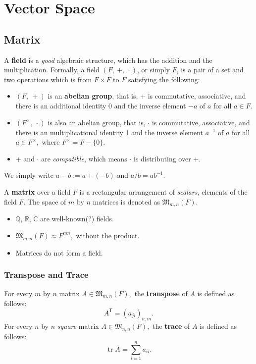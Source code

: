 \chapter{Vector Space}

\section{Matrix}
\begin{remind}
A \textbf{field} is a \textit{good} algebraic structure, which has the addition and the multiplication. Formally, a field $(F,~+,~\cdot)$, or simply $F$, is a pair of a set and two operations which is from $F\times F$ to $F$ satisfying the following:
\begin{itemize}
\item $(F,~ +)$ is an \textbf{abelian group}, that is, $+$ is commutative, associative, and there is an additional identity 0 and the inverse element $-a$ of $a$ for all $a \in F.$
\item $(F^{\times },~\cdot)$ is also an abelian group, that is, $\cdot$ is commutative, associative, and there is an multiplicational identity 1 and the inverse element $a^{-1}$ of $a$ for all $a \in F^{\times},$ where $F^{\times} = F - \{0\}.$
\item + and $\cdot$ are \textit{compatible}, which means $\cdot$ is distributing over $+.$
\end{itemize}
We simply write $a-b := a+(-b)$ and $a/b=ab^{-1}.$

A \textbf{matrix} over a field $F$ is a rectangular arrangement of \textit{scalars}, elements of the field $F$. The space of $m$ by $n$ matrices is denoted as $\mathfrak M_{m,n}(F).$
\end{remind}
\begin{ex}\leavevmode
\begin{itemize}
\item $\mathbb Q$, $\mathbb R$, $\mathbb C$ are well-known(?) fields.
\item $\mathfrak M_{m,n}(F) \approx F^{mn},$ without the product.
\item Matrices do not form a field.
\end{itemize}
\end{ex}

\subsection{Transpose and Trace}
\begin{defn}
For every $m$ by $n$ matrix $A \in \mathfrak M _{m,n}(F),$ the \textbf{transpose} of $A$ is defined as follows: $$ A^{\mathsf T} = (a_{ji})_{n,m}.$$ For every $n$ by $n$ \textit{square} matrix $A \in \mathfrak M_{n,n}(F),$ the \textbf{trace} of $A$ is defined as follows: $$\operatorname{tr}A = \sum_{i=1}^n a_{ii}.$$
\end{defn}

